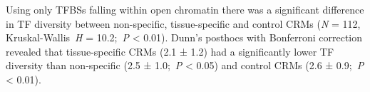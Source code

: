 \documentclass[../main.tex]{subfiles}
\begin{document}
Using only TFBSs falling within open chromatin there was a significant difference in TF diversity between non\hyp{}specific, tissue\hyp{}specific and control CRMs (\textit{N} = 112, Kruskal\hyp{}Wallis~\textit{H} = 10.2;~\textit{P} \textless{} 0.01).
Dunn's posthocs with Bonferroni correction revealed that tissue\hyp{}specific CRMs (2.1 ± 1.2) had a significantly lower TF diversity than non\hyp{}specific (2.5 ± 1.0;~\textit{P} \textless{} 0.05) and control CRMs (2.6 ± 0.9;~\textit{P} \textless{} 0.01).

\end{document}
